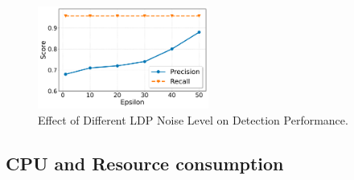 \begin{figure}[t!]
  \centering
  \includegraphics[width=0.50\textwidth]{fig/epsvsscore.pdf}
  \caption{Effect of Different LDP Noise Level on Detection Performance.}
  \label{epsvsscore}
  \vspace{-2ex}
\end{figure}

\subsection*{CPU and Resource consumption}

